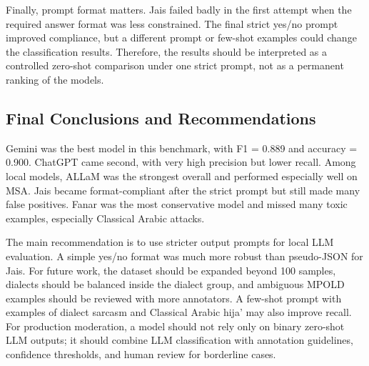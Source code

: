Finally, prompt format matters. Jais failed badly in the first attempt when the required answer format was less constrained. The final strict yes/no prompt improved compliance, but a different prompt or few-shot examples could change the classification results. Therefore, the results should be interpreted as a controlled zero-shot comparison under one strict prompt, not as a permanent ranking of the models.

\subsection{Final Conclusions and Recommendations}
Gemini was the best model in this benchmark, with F1 = 0.889 and accuracy = 0.900. ChatGPT came second, with very high precision but lower recall. Among local models, ALLaM was the strongest overall and performed especially well on MSA. Jais became format-compliant after the strict prompt but still made many false positives. Fanar was the most conservative model and missed many toxic examples, especially Classical Arabic attacks.

The main recommendation is to use stricter output prompts for local LLM evaluation. A simple yes/no format was much more robust than pseudo-JSON for Jais. For future work, the dataset should be expanded beyond 100 samples, dialects should be balanced inside the dialect group, and ambiguous MPOLD examples should be reviewed with more annotators. A few-shot prompt with examples of dialect sarcasm and Classical Arabic hija' may also improve recall. For production moderation, a model should not rely only on binary zero-shot LLM outputs; it should combine LLM classification with annotation guidelines, confidence thresholds, and human review for borderline cases.

